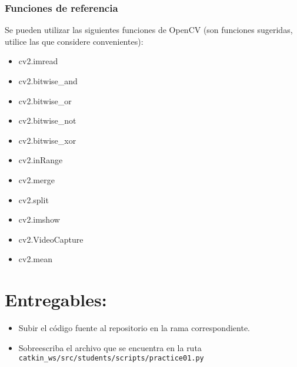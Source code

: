 \documentclass[letterpaper,11pt]{article}
\begin{document}
\subsubsection*{Funciones de referencia}
Se pueden utilizar las siguientes funciones de OpenCV (son funciones sugeridas, utilice las que considere convenientes):
\begin{multicols}{3}
  \begin{itemize}
  \item cv2.imread
  \item cv2.bitwise\_and
  \item cv2.bitwise\_or 
  \item cv2.bitwise\_not
  \item cv2.bitwise\_xor
  \item cv2.inRange
  \item cv2.merge
  \item cv2.split
  \item cv2.imshow
  \item cv2.VideoCapture
  \item cv2.mean
  \end{itemize}
\end{multicols}

\section*{Entregables:}
\begin{itemize}
\item Subir el código fuente al repositorio en la rama correspondiente.
\item Sobreescriba el archivo que se encuentra en la ruta \texttt{catkin\_ws/src/students/scripts/practice01.py}
\end{itemize}
\end{document}
